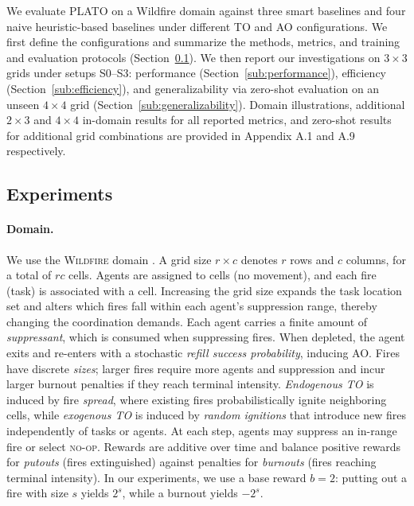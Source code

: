We evaluate PLATO on a Wildfire domain against three smart baselines and four naive heuristic-based baselines under different TO and AO configurations. We first define the configurations and summarize the methods, metrics, and training and evaluation protocols (Section~\ref{sub:experiments}). We then report our investigations on  $3\times 3$ grids under setups S0--S3: performance  (Section~\ref{sub:performance}), efficiency (Section~\ref{sub:efficiency}), and generalizability via zero-shot evaluation on an unseen $4\times 4$ grid (Section~\ref{sub:generalizability}). Domain illustrations, additional $2\times 3$ and $4\times 4$ in-domain results for all reported metrics, and zero-shot results for additional grid combinations are provided in Appendix A.1 and A.9 respectively.


\subsection{Experiments}\label{sub:experiments}
\paragraph{Domain.}\label{sec:to_ao_settings}  
We use the \textsc{Wildfire} domain \cite{patino2025inaugural}. A grid size $r\times c$ denotes $r$ rows and $c$ columns, for a total of $rc$ cells.
Agents are assigned to cells (no movement), and each fire (task) is associated with a cell.
Increasing the grid size expands the task location set and alters which fires fall within each agent's suppression range, thereby changing the coordination demands. Each agent carries a finite amount of \emph{suppressant}, which is consumed when suppressing fires. When depleted, the agent exits and re-enters with a stochastic \emph{refill success probability}, inducing AO. Fires have discrete \emph{sizes}; larger fires require more agents and suppression and incur larger burnout penalties if they reach terminal intensity. 
\emph{Endogenous TO } is induced by fire \emph{spread}, where existing fires probabilistically ignite neighboring cells, while \emph{exogenous TO} is induced by \emph{random ignitions} that introduce new fires independently of tasks or agents.
At each step, agents may suppress an in-range fire or select \textsc{no-op}.
Rewards are additive over time and balance positive rewards for \emph{putouts} (fires extinguished) against penalties for \emph{burnouts} (fires reaching terminal intensity).
In our experiments, we use a base reward $b=2$: putting out a fire with size $s$ yields $2^{s}$, while a burnout  yields $-2^{s}$.


